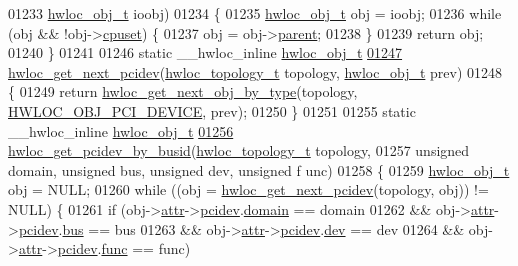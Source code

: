 \begin{DoxyCode}
{{01233                               \hyperlink{a00016}{hwloc_obj_t} ioobj)
01234 \{
01235   \hyperlink{a00016}{hwloc_obj_t} obj = ioobj;
01236   \textcolor{keywordflow}{while} (obj && !obj->\hyperlink{a00016_a67925e0f2c47f50408fbdb9bddd0790f}{cpuset}) \{
01237     obj = obj->\hyperlink{a00016_adc494f6aed939992be1c55cca5822900}{parent};
01238   \}
01239   \textcolor{keywordflow}{return} obj;
01240 \}
01241 
01246 \textcolor{keyword}{static} \_\_hwloc\_inline \hyperlink{a00016}{hwloc_obj_t}
\hypertarget{a00031_source_l01247}{}\hyperlink{a00064_gad6e1ed122ef3b6e098538d75acd5e3f6}{01247} \hyperlink{a00064_gad6e1ed122ef3b6e098538d75acd5e3f6}{hwloc_get_next_pcidev}(\hyperlink{a00039_ga9d1e76ee15a7dee158b786c30b6a6e38}{hwloc_topology_t} topology, \hyperlink{a00016}{hwloc_obj_t} prev)
01248 \{
01249   \textcolor{keywordflow}{return} \hyperlink{a00053_ga5f08ceb69375341e73563cfe2e77534e}{hwloc_get_next_obj_by_type}(topology, \hyperlink{a00041_ggacd37bb612667dc437d66bfb175a8dc55a5d8117a54df1fbd3606ab19e42cb0ea9}{HWLOC_OBJ_PCI_DEVICE}, prev);
01250 \}
01251 
01255 \textcolor{keyword}{static} \_\_hwloc\_inline \hyperlink{a00016}{hwloc_obj_t}
\hypertarget{a00031_source_l01256}{}\hyperlink{a00064_ga546e1d690c63fb24177f3013ed78ceb1}{01256} \hyperlink{a00064_ga546e1d690c63fb24177f3013ed78ceb1}{hwloc_get_pcidev_by_busid}(\hyperlink{a00039_ga9d1e76ee15a7dee158b786c30b6a6e38}{hwloc_topology_t} topology,
01257                           \textcolor{keywordtype}{unsigned} domain, \textcolor{keywordtype}{unsigned} bus, \textcolor{keywordtype}{unsigned} dev, \textcolor{keywordtype}{unsigned} f
      unc)
01258 \{
01259   \hyperlink{a00016}{hwloc_obj_t} obj = NULL;
01260   \textcolor{keywordflow}{while} ((obj = \hyperlink{a00064_gad6e1ed122ef3b6e098538d75acd5e3f6}{hwloc_get_next_pcidev}(topology, obj)) != NULL) \{
01261     \textcolor{keywordflow}{if} (obj->\hyperlink{a00016_accd40e29f71f19e88db62ea3df02adc8}{attr}->\hyperlink{a00017_a4203d713ce0f5beaa6ee0e9bdac70828}{pcidev}.\hyperlink{a00022_a8fba44988deb98613c1505a4019a34dc}{domain} == domain
01262         && obj->\hyperlink{a00016_accd40e29f71f19e88db62ea3df02adc8}{attr}->\hyperlink{a00017_a4203d713ce0f5beaa6ee0e9bdac70828}{pcidev}.\hyperlink{a00022_aae99e035e8d1387d7b8768aaa8eceb0a}{bus} == bus
01263         && obj->\hyperlink{a00016_accd40e29f71f19e88db62ea3df02adc8}{attr}->\hyperlink{a00017_a4203d713ce0f5beaa6ee0e9bdac70828}{pcidev}.\hyperlink{a00022_a3d70c84a12f7e93d14c8d47bf4fd9dc5}{dev} == dev
01264         && obj->\hyperlink{a00016_accd40e29f71f19e88db62ea3df02adc8}{attr}->\hyperlink{a00017_a4203d713ce0f5beaa6ee0e9bdac70828}{pcidev}.\hyperlink{a00022_a695f32df53f4ef728670bfcf31b74e0f}{func} == func)
}}
\end{DoxyCode}
